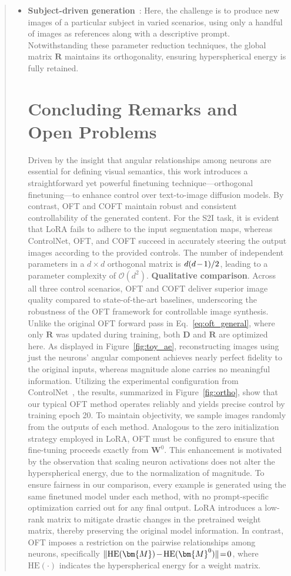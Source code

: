 \begin{abstract}
\begin{itemize}[leftmargin=*,nosep]
    \item \textbf{Subject-driven generation}~\cite{ruiz2023dreambooth}: Here, the challenge is to produce new images of a particular subject in varied scenarios, using only a handful of images as references along with a descriptive prompt. Notwithstanding these parameter reduction techniques, the global matrix $\bm{R}$ maintains its orthogonality, ensuring hyperspherical energy is fully retained. \section{Concluding Remarks and Open Problems}

Driven by the insight that angular relationships among neurons are essential for defining visual semantics, this work introduces a straightforward yet powerful finetuning technique—orthogonal finetuning—to enhance control over text-to-image diffusion models. By contrast, OFT and COFT maintain robust and consistent controllability of the generated content. For the S2I task, it is evident that LoRA fails to adhere to the input segmentation maps, whereas ControlNet, OFT, and COFT succeed in accurately steering the output images according to the provided controls. The number of independent parameters in a $d\times d$ orthogonal matrix is $\thickmuskip=2mu \medmuskip=2mu d(d-1)/2$, leading to a parameter complexity of $\mathcal{O}(d^2)$. \textbf{Qualitative comparison}. Across all three control scenarios, OFT and COFT deliver superior image quality compared to state-of-the-art baselines, underscoring the robustness of the OFT framework for controllable image synthesis. Unlike the original OFT forward pass in Eq.~\eqref{eq:oft_general}, where only $\bm{R}$ was updated during training, both $\bm{D}$ and $\bm{R}$ are optimized here. As displayed in Figure~\ref{fig:toy_ae}, reconstructing images using just the neurons' angular component achieves nearly perfect fidelity to the original inputs, whereas magnitude alone carries no meaningful information. Utilizing the experimental configuration from ControlNet~\cite{zhang2023adding}, the results, summarized in Figure~\ref{fig:ortho}, show that our typical OFT method operates reliably and yields precise control by training epoch 20. To maintain objectivity, we sample images randomly from the outputs of each method. Analogous to the zero initialization strategy employed in LoRA, OFT must be configured to ensure that fine-tuning proceeds exactly from $\bm{W}^0$. This enhancement is motivated by the observation that scaling neuron activations does not alter the hyperspherical energy, due to the normalization of magnitude. To ensure fairness in our comparison, every example is generated using the same finetuned model under each method, with no prompt-specific optimization carried out for any final output. LoRA introduces a low-rank matrix to mitigate drastic changes in the pretrained weight matrix, thereby preserving the original model information. In contrast, OFT imposes a restriction on the pairwise relationships among neurons, specifically $\thickmuskip=2mu \medmuskip=2mu \| \text{HE}(\bm{M})-\text{HE}(\bm{M}^0) \|=0$, where $\text{HE}(\cdot)$ indicates the hyperspherical energy for a weight matrix. 
\end{itemize}
\end{abstract}

